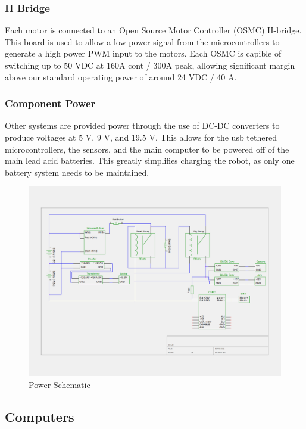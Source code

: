 \subsubsection{H Bridge}

Each motor is connected to an Open Source Motor Controller (OSMC) H-bridge. This board is used to allow a low power signal from the microcontrollers to generate a high power PWM input to the motors. Each OSMC is capible of switching up to 50 VDC at 160A cont / 300A peak, allowing significant margin above our standard operating power of around 24 VDC / 40 A.

\subsubsection{Component Power}

Other systems are provided power through the use of DC-DC converters to produce voltages at 5 V, 9 V, and 19.5 V. This allows for the usb tethered microcontrollers, the sensors, and the main computer to be powered off of the main lead acid batteries. This greatly simplifies charging the robot, as only one battery system needs to be maintained.

\begin{figure}[H]
\begin{center}
\includegraphics[width=6in]{./igvc_power.png}
\caption{Power Schematic}
\label{FIG:Power}
\end{center}
\end{figure}

\subsection{Computers}

